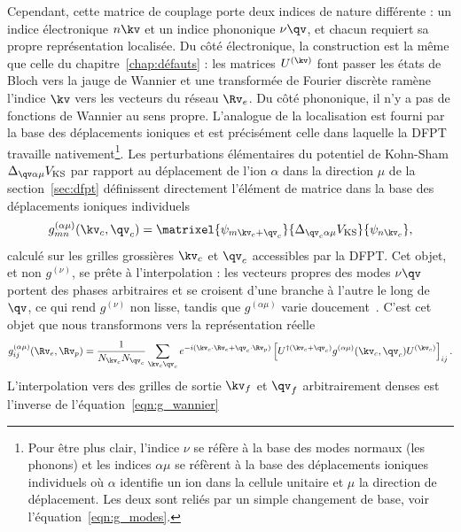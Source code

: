 Cependant, cette matrice de couplage porte deux indices de nature différente : un indice électronique $n\kv$ et un indice phononique $\nu\qv$, et chacun requiert sa propre représentation localisée. Du côté électronique, la construction est la même que celle du chapitre~\ref{chap:défauts} : les matrices $U^{(\kv)}$ font passer les états de Bloch vers la jauge de Wannier et une transformée de Fourier discrète ramène l'indice $\kv$ vers les vecteurs du réseau $\Rv_e$. Du côté phononique, il n'y a pas de fonctions de Wannier au sens propre. L'analogue de la localisation est fourni par la base des déplacements ioniques et est précisément celle dans laquelle la DFPT travaille nativement\footnote{Pour être plus clair, l'indice $\nu$ se réfère à la base des modes normaux (les phonons) et les indices $\alpha\mu$ se réfèrent à la base des déplacements ioniques individuels où $\alpha$ identifie un ion dans la cellule unitaire et $\mu$ la direction de déplacement. Les deux sont reliés par un simple changement de base, voir l'équation~\eqref{eqn:g_modes}.}. Les perturbations élémentaires du potentiel de Kohn-Sham $\Delta_{\qv\alpha\mu}V_\text{KS}$ par rapport au déplacement de l'ion $\alpha$ dans la direction $\mu$ de la section~\ref{sec:dfpt} définissent directement l'élément de matrice dans la base des déplacements ioniques individuels
\begin{equation}
    g_{mn}^{(\alpha\mu)}(\kv_c,\qv_c) =
    \matrixel{\psi_{m\kv_c+\qv_c}}{\Delta_{\qv_c\alpha\mu}V_\text{KS}}{\psi_{n\kv_c}},\label{eqn:g_atomique}
\end{equation}
calculé sur les grilles grossières $\kv_c$ et $\qv_c$ accessibles par la DFPT. Cet objet, et non $g^{(\nu)}$, se prête à l'interpolation : les vecteurs propres des modes $\nu\qv$ portent des phases arbitraires et se croisent d'une branche à l'autre le long de $\qv$, ce qui rend $g^{(\nu)}$ non lisse, tandis que $g^{(\alpha\mu)}$ varie doucement~\cite{giustinoElectronphononInteractionsFirst2017,ponceEPWElectronphononCoupling2016}. C'est cet objet que nous transformons vers la représentation réelle
\begin{equation}
    g_{ij}^{(\alpha\mu)}(\Rv_e,\Rv_p) =
    \frac{1}{N_{\kv_c}N_{\qv_c}}\sum_{\kv_c\qv_c}
    e^{-i(\kv_c\cdot\Rv_e+\qv_c\cdot\Rv_p)}
    \left[U^{\dag(\kv_c+\qv_c)}g^{(\alpha\mu)}(\kv_c,\qv_c)U^{(\kv_c)}\right]_{ij}.
    \label{eqn:g_wannier}
\end{equation}
L'interpolation vers des grilles de sortie $\kv_f$ et $\qv_f$ arbitrairement denses est l'inverse de l'équation~\eqref{eqn:g_wannier}
